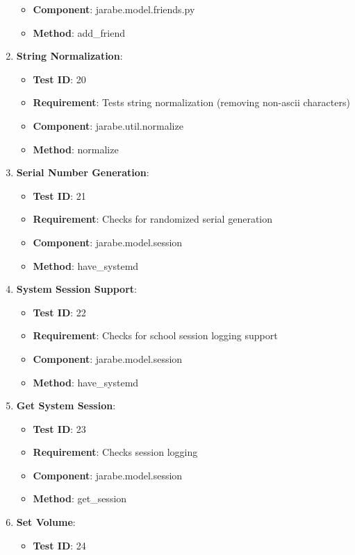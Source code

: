 \documentclass{article}
\begin{document}
\begin{enumerate}[noitemsep,topsep=0pt]
\begin{itemize}[noitemsep,topsep=0pt]
\item \textbf{Component}: jarabe.model.friends.py
\item \textbf{Method}: add\_friend
\end{itemize}
\item \textbf{String Normalization}:
\begin{itemize}[noitemsep,topsep=0pt]
\item \textbf{Test ID}: 20
\item \textbf{Requirement}: Tests string normalization (removing non-ascii characters)
\item \textbf{Component}: jarabe.util.normalize
\item \textbf{Method}: normalize
\end{itemize}
\item \textbf{Serial Number Generation}:
\begin{itemize}[noitemsep,topsep=0pt]
\item \textbf{Test ID}: 21
\item \textbf{Requirement}: Checks for randomized serial generation
\item \textbf{Component}: jarabe.model.session
\item \textbf{Method}: have\_systemd
\end{itemize}
\item \textbf{System Session Support}:
\begin{itemize}[noitemsep,topsep=0pt]
\item \textbf{Test ID}: 22
\item \textbf{Requirement}: Checks for school session logging support
\item \textbf{Component}: jarabe.model.session
\item \textbf{Method}: have\_systemd
\end{itemize}
\item \textbf{Get System Session}:
\begin{itemize}[noitemsep,topsep=0pt]
\item \textbf{Test ID}: 23
\item \textbf{Requirement}: Checks session logging
\item \textbf{Component}: jarabe.model.session
\item \textbf{Method}: get\_session
\end{itemize}
\item \textbf{Set Volume}:
\begin{itemize}[noitemsep,topsep=0pt]
\item \textbf{Test ID}: 24

\end{itemize}
\end{enumerate}
\end{document}
